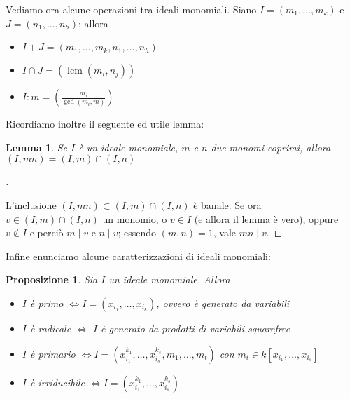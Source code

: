 \documentclass[a4paper,10pt]{article}
\theoremstyle{plain}
\newtheorem{lemma}[thm]{Lemma}
\newtheorem{prop}[thm]{Proposizione}
\theoremstyle{definition}
\newenvironment{myproof}[1][\proofname]{%
  \begin{proof}[#1]$ $\par\nobreak\ignorespaces
}{%
  \qedhere
  \end{proof}
}
\DeclareMathOperator{\lcm}{lcm}
\begin{document}
Vediamo ora alcune operazioni tra ideali monomiali. Siano $I=(m_1,\dots,m_k)$ e $J=(n_1,\dots,n_h)$; allora
\begin{itemize}
    \item $I+J=(m_1,\dots,m_k,n_1,\dots,n_h)$
    \item $I\cap J=\left( \lcm(m_i,n_j) \right)$
    \item $I:m=\left( \frac{m_i}{\gcd(m_i,m)} \right)$
\end{itemize}

Ricordiamo inoltre il seguente ed utile lemma:
\begin{lemma}
    Se $I$ è un ideale monomiale, $m$ e $n$ due monomi coprimi, allora $(I,mn)=(I,m)\cap(I,n)$
\end{lemma}
\begin{myproof}
    L'inclusione $(I,mn)\subset(I,m)\cap(I,n)$ è banale. Se ora $v\in (I,m)\cap(I,n)$ un monomio, o $v\in I$ (e allora il lemma è vero), oppure $v\not\in I$ e perciò $m\mid v$ e $n\mid v$; essendo $(m,n)=1$, vale $mn\mid v$.
\end{myproof}

Infine enunciamo alcune caratterizzazioni di ideali monomiali:
\begin{prop}
    Sia $I$ un ideale monomiale. Allora
    \begin{itemize}
        \item $I$ è primo $\iff I=(x_{i_1},\dots,x_{i_k})$, ovvero è generato da variabili
        \item $I$ è radicale $\iff$ $I$ è generato da prodotti di variabili squarefree
        \item $I$ è primario $\iff I=(x_{i_1}^{k_1},\dots,x_{i_s}^{k_s},m_1,\dots,m_t)$ con $m_i\in k[x_{i_1},\dots,x_{i_s}]$
        \item $I$ è irriducibile $\iff I=(x_{i_1}^{k_1},\dots,x_{i_s}^{k_s})$
    \end{itemize}
\end{prop}
\end{document}
